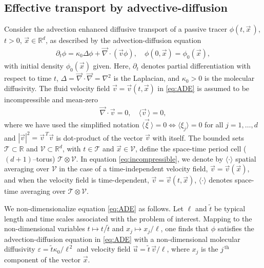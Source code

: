 \documentclass[11pt]{amsart}
\newcommand{\Tc}{\mathcal{T}}
\newcommand{\Vc}{\mathcal{V}}
\begin{document}
\subsection{Effective transport by
  advective-diffusion} \label{sec:Eff_Trans}  
%
Consider the advection enhanced diffusive transport of a passive
tracer $\phi(t,\vec{x}\,)$, $t>0$, $\vec{x}\in\mathbb{R}^d$, as described by
the advection-diffusion equation 
%
\begin{align}\label{eq:ADE}
  \partial_t\phi=\kappa_0\Delta \phi+\vec{\nabla}\cdot(\vec{v}\phi), \quad
  \phi(0,\vec{x})=\phi_0(\vec{x}),
\end{align}
% 
with initial density $\phi_0(\vec{x})$ given. Here, $\partial_t$ denotes partial
differentiation with respect to time $t$, $\Delta=\vec{\nabla}\cdot\vec{\nabla}=\nabla^2$ is
the Laplacian, and $\kappa_0>0$ is the molecular diffusivity. The fluid
velocity field $\vec{v}=\vec{v}(t,\vec{x})$ in \eqref{eq:ADE} is
assumed to be incompressible and mean-zero 
%
\begin{align}\label{eq:incompressible}
  \vec{\nabla}\cdot\vec{v}=0, \quad
  \langle\vec{v}\,\rangle=0,
\end{align}
%
where we have used the simplified notation $\langle\vec{\xi}\,\rangle=0\iff\langle\xi_j\rangle=0$ for
all $j=1,\ldots,d$ and $|\vec{v}|^2=\vec{v}^{\,T}\vec{v}$ is dot-product of
the vector $\vec{v}$ with itself. The bounded sets $\Tc\subset\mathbb{R}$ and    
$\Vc\subset\mathbb{R}^d$, with $t\in\Tc$ and $\vec{x}\in\Vc$, define the
space-time period cell ($(d+1)$--torus) $\Tc\otimes\Vc$. In equation
\eqref{eq:incompressible}, we denote by $\langle\cdot\rangle$ spatial averaging over
$\Vc$ in the case of a time-independent velocity field,
$\vec{v}=\vec{v}(\vec{x})$, and when the velocity field is
time-dependent, $\vec{v}=\vec{v}(t,\vec{x})$, $\langle\cdot\rangle$ denotes space-time
averaging over $\Tc\otimes\Vc$. 



We non-dimensionalize equation
\eqref{eq:ADE} as follows. Let $\ell$ and $\tilde{t}$ be typical length and time 
scales associated with the problem of interest. Mapping to the
non-dimensional variables $t\mapsto t/\tilde{t}$ and $x_j\mapsto x_j/\ell$, one finds that
$\phi$ satisfies the advection-diffusion 
equation in \eqref{eq:ADE} with a non-dimensional molecular
diffusivity $\varepsilon=\tilde{t}\kappa_0/\ell^{\,2}$ and velocity field
$\vec{u}=\tilde{t}\,\vec{v}/\ell$, where $x_j$ is the $j^{\,\text{th}}$
component of the vector $\vec{x}$.
\end{document}
